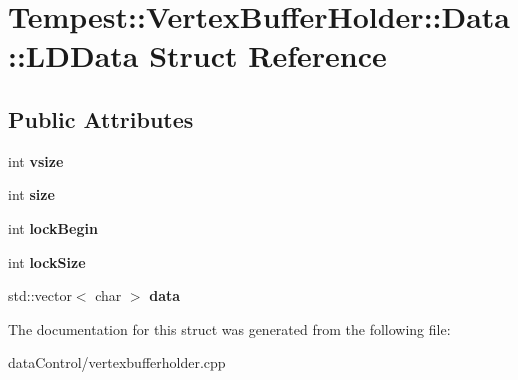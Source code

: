 \hypertarget{struct_vertex_buffer_holder_1_1_data_1_1_l_d_data}{\section{Tempest\+:\+:Vertex\+Buffer\+Holder\+:\+:Data\+:\+:L\+D\+Data Struct Reference}
\label{struct_vertex_buffer_holder_1_1_data_1_1_l_d_data}
}
\subsection*{Public Attributes}
\begin{DoxyCompactItemize}
\item 
\hypertarget{struct_vertex_buffer_holder_1_1_data_1_1_l_d_data_ad7e6e5af10a1fb10dfb284564f594377}{int {\bfseries vsize}}\label{struct_vertex_buffer_holder_1_1_data_1_1_l_d_data_ad7e6e5af10a1fb10dfb284564f594377}

\item 
\hypertarget{struct_vertex_buffer_holder_1_1_data_1_1_l_d_data_a926f0e24dba8b7f6c2dfa97e6fcc3e20}{int {\bfseries size}}\label{struct_vertex_buffer_holder_1_1_data_1_1_l_d_data_a926f0e24dba8b7f6c2dfa97e6fcc3e20}

\item 
\hypertarget{struct_vertex_buffer_holder_1_1_data_1_1_l_d_data_a79f249c95479d0508204cd8839911462}{int {\bfseries lock\+Begin}}\label{struct_vertex_buffer_holder_1_1_data_1_1_l_d_data_a79f249c95479d0508204cd8839911462}

\item 
\hypertarget{struct_vertex_buffer_holder_1_1_data_1_1_l_d_data_aa1e1ab333d6d23842e29066fd5f0b272}{int {\bfseries lock\+Size}}\label{struct_vertex_buffer_holder_1_1_data_1_1_l_d_data_aa1e1ab333d6d23842e29066fd5f0b272}

\item 
\hypertarget{struct_vertex_buffer_holder_1_1_data_1_1_l_d_data_aa999d8cad8eabd8df1c13c3eaecccf56}{std\+::vector$<$ char $>$ {\bfseries data}}\label{struct_vertex_buffer_holder_1_1_data_1_1_l_d_data_aa999d8cad8eabd8df1c13c3eaecccf56}

\end{DoxyCompactItemize}


The documentation for this struct was generated from the following file\+:\begin{DoxyCompactItemize}
\item 
data\+Control/vertexbufferholder.\+cpp\end{DoxyCompactItemize}
